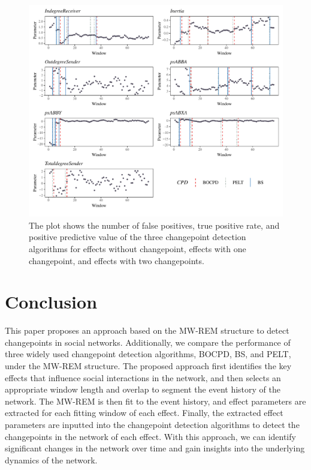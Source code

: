 \documentclass[]{interact}
\theoremstyle{plain}%
\theoremstyle{definition}
\theoremstyle{remark}
\begin{document}
{    \begin{figure}[h]
    	\captionsetup{justification=raggedright}
    	\renewcommand{\figurename}{Figure}
    	\centering
    	\includegraphics[width=\textwidth,height=\textheight,keepaspectratio]{Apollo_CPD_bw}
    	\caption{\fontsize{8}{10}\selectfont The plot shows the number of false positives, true positive rate, and positive predictive value of the three changepoint detection algorithms for effects without changepoint, effects with one changepoint, and effects with two changepoints.}
    	\label{Figure 6}
    \end{figure}
	
	\section{\fontsize{14}{15}\selectfont Conclusion} \label{sec:conclusion}
	
	\hspace{0.28cm} This paper proposes an approach based on the MW-REM structure to detect changepoints in social networks. Additionally, we compare the performance of three widely used changepoint detection algorithms, BOCPD, BS, and PELT, under the MW-REM structure. The proposed approach first identifies the key effects that influence social interactions in the network, and then selects an appropriate window length and overlap to segment the event history of the network. The MW-REM is then fit to the event history, and effect parameters are extracted for each fitting window of each effect. Finally, the extracted effect parameters are inputted into the changepoint detection algorithms to detect the changepoints in the network of each effect. With this approach, we can identify significant changes in the network over time and gain insights into the underlying dynamics of the network. \\
	
}
\end{document}
